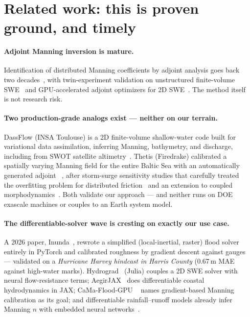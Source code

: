\documentclass[11pt]{article}
\begin{document}
\section{Related work: this is proven ground, and timely}

\paragraph{Adjoint Manning inversion is mature.}
Identification of distributed Manning coefficients by adjoint analysis goes
back two decades~\cite{ding2004manning}, with twin-experiment validation on
unstructured finite-volume SWE~\cite{yan2014adjoint} and GPU-accelerated
adjoint optimizers for 2D SWE~\cite{lacasta2016gpu}. The method itself is
not research risk.

\paragraph{Two production-grade analogs exist --- neither on our terrain.}
DassFlow (INSA Toulouse) is a 2D finite-volume shallow-water code built for
variational data assimilation, inferring Manning, bathymetry, and discharge,
including from SWOT satellite altimetry~\cite{brisset2018swot,dassflow}.
Thetis (Firedrake) calibrated a spatially varying Manning field for the
entire Baltic Sea with an automatically generated adjoint%
~\cite{karna2023baltic}, after storm-surge sensitivity studies that
carefully treated the overfitting problem for distributed
friction~\cite{warder2021storm} and an extension to coupled
morphodynamics~\cite{clare2022morpho}. Both validate our approach ---
and neither runs on DOE exascale machines or couples to an Earth system
model.

\paragraph{The differentiable-solver wave is cresting on exactly our use case.}
A 2026 paper, Inunda~\cite{li2026inunda}, rewrote a simplified
(local-inertial, raster) flood solver entirely in PyTorch and calibrated
roughness by gradient descent against gauges --- validated on a
\emph{Hurricane Harvey hindcast in Harris County} (0.67\,m MAE against
high-water marks). Hydrograd~\cite{liu2025uswe} (Julia) couples a 2D SWE
solver with neural flow-resistance terms; AegirJAX~\cite{cardoso2026aegir}
does differentiable coastal hydrodynamics in JAX; CaMa-Flood-GPU%
~\cite{kang2026cama} names gradient-based Manning calibration as its goal;
and differentiable rainfall--runoff models already infer Manning $n$ with
embedded neural networks~\cite{bindas2024routing}.
\end{document}
